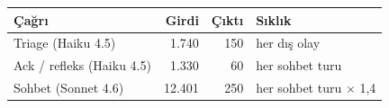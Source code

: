 \begin{tabular}{@{}lrrl@{}}
\toprule
\textbf{Çağrı} & \textbf{Girdi} & \textbf{Çıktı} & \textbf{Sıklık} \\
\midrule
Triage (Haiku 4.5) & 1.740 & 150 & her dış olay \\
Ack / refleks (Haiku 4.5) & 1.330 & 60 & her sohbet turu \\
Sohbet (Sonnet 4.6) & 12.401 & 250 & her sohbet turu $\times$ 1,4 \\
\bottomrule
\end{tabular}
